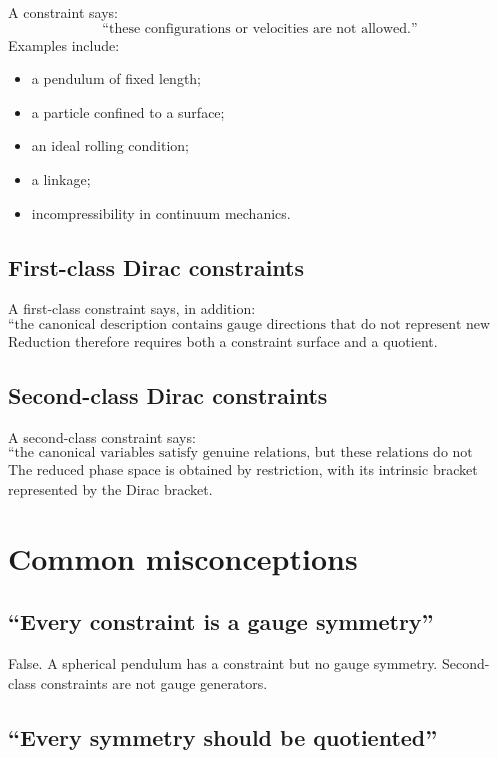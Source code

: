 \documentclass[11pt,a4paper]{article}
\theoremstyle{definition}
\begin{document}
A constraint says:
\[
        \text{``these configurations or velocities are not allowed.''}
\]
Examples include:
\begin{itemize}
\item a pendulum of fixed length;
\item a particle confined to a surface;
\item an ideal rolling condition;
\item a linkage;
\item incompressibility in continuum mechanics.
\end{itemize}

\subsection{First-class Dirac constraints}

A first-class constraint says, in addition:
\[
        \text{``the canonical description contains gauge directions
        that do not represent new physical states.''}
\]
Reduction therefore requires both a constraint surface and a quotient.

\subsection{Second-class Dirac constraints}

A second-class constraint says:
\[
        \text{``the canonical variables satisfy genuine relations,
        but these relations do not generate gauge freedom.''}
\]
The reduced phase space is obtained by restriction, with its intrinsic
bracket represented by the Dirac bracket.

\section{Common misconceptions}

\subsection{``Every constraint is a gauge symmetry''}

False.  A spherical pendulum has a constraint but no gauge symmetry.
Second-class constraints are not gauge generators.

\subsection{``Every symmetry should be quotiented''}
\end{document}
